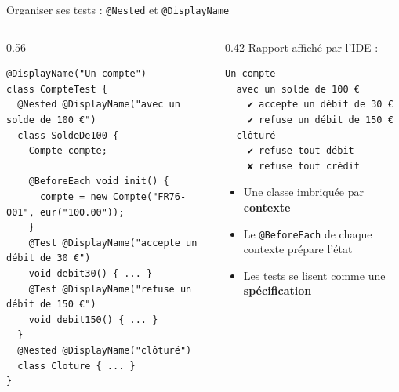 \documentclass[aspectratio=169,10pt]{beamer}
\begin{document}
\begin{frame}[fragile]{Organiser ses tests : \texttt{@Nested} et \texttt{@DisplayName}}
  \begin{columns}[T]
    \begin{column}{0.56\textwidth}
\begin{lstlisting}[basicstyle=\lstcode\scriptsize]
@DisplayName("Un compte")
class CompteTest {
  @Nested @DisplayName("avec un solde de 100 €")
  class SoldeDe100 {
    Compte compte;

    @BeforeEach void init() {
      compte = new Compte("FR76-001", eur("100.00"));
    }
    @Test @DisplayName("accepte un débit de 30 €")
    void debit30() { ... }
    @Test @DisplayName("refuse un débit de 150 €")
    void debit150() { ... }
  }
  @Nested @DisplayName("clôturé")
  class Cloture { ... }
}
\end{lstlisting}
    \end{column}
    \begin{column}{0.42\textwidth}
      Rapport affiché par l'IDE :
\begin{lstlisting}[style=sortie]
Un compte
  avec un solde de 100 €
    ✔ accepte un débit de 30 €
    ✔ refuse un débit de 150 €
  clôturé
    ✔ refuse tout débit
    ✘ refuse tout crédit
\end{lstlisting}
      \begin{itemize}
        \item Une classe imbriquée par \textbf{contexte}
        \item Le \texttt{@BeforeEach} de chaque contexte prépare l'état
        \item Les tests se lisent comme une \textbf{spécification}
      \end{itemize}
    \end{column}
  \end{columns}
\end{frame}
\end{document}
